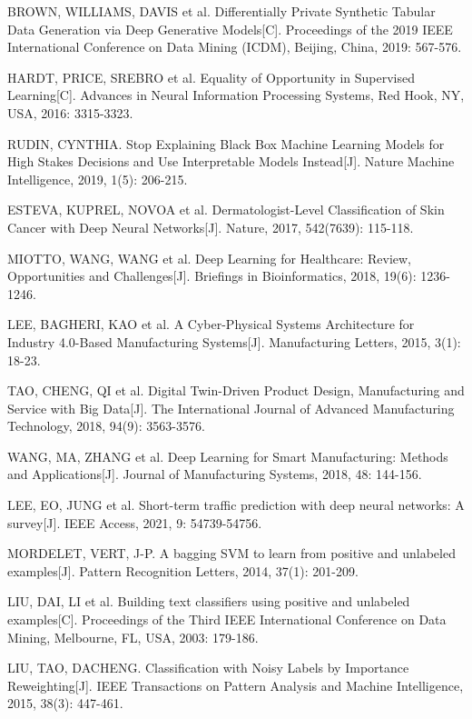 \begin{thebibliography}{200}
	BROWN, WILLIAMS, DAVIS et al. Differentially Private Synthetic Tabular Data Generation via Deep Generative Models[C]. Proceedings of the 2019 IEEE International Conference on Data Mining (ICDM), Beijing, China, 2019: 567-576.
	
	HARDT, PRICE, SREBRO et al. Equality of Opportunity in Supervised Learning[C]. Advances in Neural Information Processing Systems, Red Hook, NY, USA, 2016: 3315-3323.
	
	RUDIN, CYNTHIA. Stop Explaining Black Box Machine Learning Models for High Stakes Decisions and Use Interpretable Models Instead[J]. Nature Machine Intelligence, 2019, 1(5): 206-215.
	
	ESTEVA, KUPREL, NOVOA et al. Dermatologist-Level Classification of Skin Cancer with Deep Neural Networks[J]. Nature, 2017, 542(7639): 115-118.
	
	MIOTTO, WANG, WANG et al. Deep Learning for Healthcare: Review, Opportunities and Challenges[J]. Briefings in Bioinformatics, 2018, 19(6): 1236-1246.
	
	LEE, BAGHERI, KAO et al. A Cyber-Physical Systems Architecture for Industry 4.0-Based Manufacturing Systems[J]. Manufacturing Letters, 2015, 3(1): 18-23.
	
	TAO, CHENG, QI et al. Digital Twin-Driven Product Design, Manufacturing and Service with Big Data[J]. The International Journal of Advanced Manufacturing Technology, 2018, 94(9): 3563-3576.
	
	WANG, MA, ZHANG et al. Deep Learning for Smart Manufacturing: Methods and Applications[J]. Journal of Manufacturing Systems, 2018, 48: 144-156.
	
	LEE, EO, JUNG et al. Short-term traffic prediction with deep neural networks: A survey[J]. IEEE Access, 2021, 9: 54739-54756.
	
	MORDELET, VERT, J-P. A bagging SVM to learn from positive and unlabeled examples[J]. Pattern Recognition Letters, 2014, 37(1): 201-209.
	
	LIU, DAI, LI et al. Building text classifiers using positive and unlabeled examples[C]. Proceedings of the Third IEEE International Conference on Data Mining, Melbourne, FL, USA, 2003: 179-186.
	
	LIU, TAO, DACHENG. Classification with Noisy Labels by Importance Reweighting[J]. IEEE Transactions on Pattern Analysis and Machine Intelligence, 2015, 38(3): 447-461.
	

\end{thebibliography}
